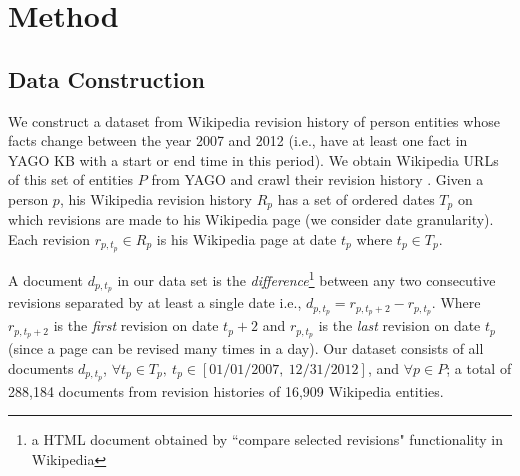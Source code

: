 \section{Method} \label{sec:method}

\subsection{Data Construction} \label{sec:data}
We construct a dataset from Wikipedia revision history of person entities whose facts change between the year 2007 and 2012 (i.e., have at least one fact in YAGO KB \cite{suchanek2007yago} with a start or end time in this period). We obtain Wikipedia URLs of this set of entities $P$ from YAGO and crawl their revision history%
. Given a person $p$, his Wikipedia revision history $R_p$ has a set of ordered dates $T_p$ on which revisions are made to his Wikipedia page (we consider date granularity). Each revision $r_{p, t_p} \in R_p$ is his Wikipedia page at date $t_p$ where $t_p \in T_p$. 

A document $d_{p, t_p}$ in our data set is the \textit{difference}\footnote{a HTML document obtained by ``compare selected revisions"  functionality in Wikipedia} between any two consecutive revisions separated by at least a single date i.e., $d_{p, t_p} = r_{p, t_p+2} - r_{p, t_p}$. Where $r_{p, t_p+2}$ is the \textit{first} revision on date $t_p+2$ and $r_{p, {t_p}}$ is the \textit{last} revision on date $t_p$ (since a page can be revised many times in a day). Our dataset consists of all documents $d_{p, t_p}$, $\forall t_p \in T_p,\ t_p \in [01/01/2007,\ 12/31/2012]$, and $\forall p \in P$; a total of 288,184 documents from revision histories of 16,909 Wikipedia entities.


